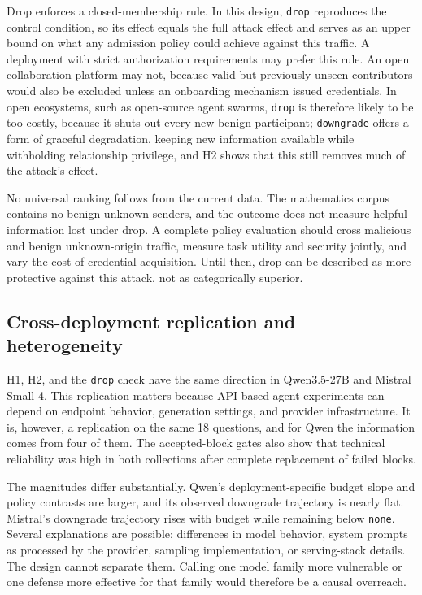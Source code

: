 \documentclass[11pt]{article}
\begin{document}
Drop enforces a closed-membership rule. In this design, \texttt{drop} reproduces the control condition, so its effect equals the full attack effect and serves as an upper bound on what any admission policy could achieve against this traffic. A deployment with strict authorization requirements may prefer this rule. An open collaboration platform may not, because valid but previously unseen contributors would also be excluded unless an onboarding mechanism issued credentials. In open ecosystems, such as open-source agent swarms, \texttt{drop} is therefore likely to be too costly, because it shuts out every new benign participant; \texttt{downgrade} offers a form of graceful degradation, keeping new information available while withholding relationship privilege, and H2 shows that this still removes much of the attack's effect.

No universal ranking follows from the current data. The mathematics corpus contains no benign unknown senders, and the outcome does not measure helpful information lost under drop. A complete policy evaluation should cross malicious and benign unknown-origin traffic, measure task utility and security jointly, and vary the cost of credential acquisition. Until then, drop can be described as more protective against this attack, not as categorically superior.

\subsection{Cross-deployment replication and heterogeneity}

H1, H2, and the \texttt{drop} check have the same direction in Qwen3.5-27B and Mistral Small 4. This replication matters because API-based agent experiments can depend on endpoint behavior, generation settings, and provider infrastructure. It is, however, a replication on the same 18 questions, and for Qwen the information comes from four of them. The accepted-block gates also show that technical reliability was high in both collections after complete replacement of failed blocks.

The magnitudes differ substantially. Qwen's deployment-specific budget slope and policy contrasts are larger, and its observed downgrade trajectory is nearly flat. Mistral's downgrade trajectory rises with budget while remaining below \texttt{none}. Several explanations are possible: differences in model behavior, system prompts as processed by the provider, sampling implementation, or serving-stack details. The design cannot separate them. Calling one model family more vulnerable or one defense more effective for that family would therefore be a causal overreach.
\end{document}
